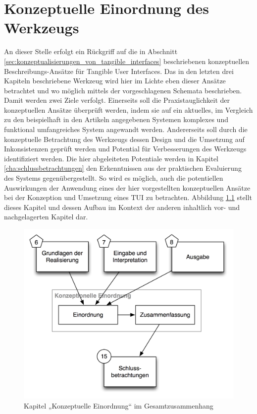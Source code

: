 
\chapter{Konzeptuelle Einordnung des Werkzeugs} %
\label{cha:konzeptuelle_evaluierung}

An dieser Stelle erfolgt ein Rückgriff auf die in Abschnitt \ref{sec:konzeptualisierungen_von_tangible_interfaces} beschriebenen konzeptuellen Beschreibungs-Ansätze für Tangible User Interfaces. Das in den letzten drei Kapiteln beschriebene Werkzeug wird hier im Lichte eben dieser Ansätze betrachtet und wo möglich mittels der vorgeschlagenen Schemata beschrieben. Damit werden zwei Ziele verfolgt. Einerseits soll die Praxistauglichkeit der konzeptuellen Ansätze überprüft werden, indem sie auf ein aktuelles, im Vergleich zu den beispielhaft in den Artikeln angegebenen Systemen komplexes und funktional umfangreiches System angewandt werden. Andererseits soll durch die konzeptuelle Betrachtung des Werkzeugs dessen Design und die Umsetzung auf Inkonsistenzen geprüft werden und Potential für Verbesserungen des Werkzeugs identifiziert werden. Die hier abgeleiteten Potentiale werden in Kapitel \ref{cha:schlussbetrachtungen} den Erkenntnissen aus der praktischen Evaluierung des Systems gegenübergestellt. So wird es möglich, auch die potentiellen Auswirkungen der Anwendung eines der hier vorgestellten konzeptuellen Ansätze bei der Konzeption und Umsetzung eines \gls{TUI} zu betrachten. Abbildung \ref{fig:img_Kontextgrafiken_k10} stellt dieses Kapitel und dessen Aufbau im Kontext der anderen inhaltlich vor- und nachgelagerten Kapitel dar.

\begin{figure}[htbp]
	\centering
		\includegraphics[scale=0.6]{img/Kontextgrafiken/k10.png}
	\caption{Kapitel „Konzeptuelle Einordnung“ im Gesamtzusammenhang}
	\label{fig:img_Kontextgrafiken_k10}
\end{figure}

